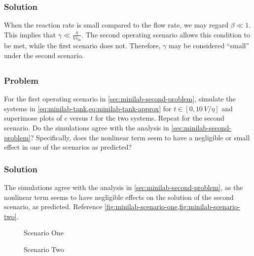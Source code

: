 \documentclass[12pt]{article}
\begin{document}
\subsubsection*{Solution}
When the reaction rate is small compared to the flow rate, we may regard $\beta
\ll 1$. This implies that $\gamma \ll \frac{\eta}{Vc_\text{in}}$. The second
operating scenario allows this condition to be met, while the first scenario
does not. Therefore, $\gamma$ may be considered ``small'' under the second
scenario.

\subsection{}
\subsubsection*{Problem}
For the first operating scenario in \cref{sec:minilab-second-problem}, simulate
the systems in \cref{eq:minilab-tank,eq:minilab-tank-approx} for
$t\in[0,10\,V/\eta]$ and superimose plots of $c$ versus $t$ for the two systems.
Repeat for the second scenario. Do the simulations agree with the analysis in
\cref{sec:minilab-second-problem}? Specifically, does the nonlinear term seem
to have a negligible or small effect in one of the scenarios as predicted?

\subsubsection*{Solution}
The simulations agree with the analysis in \cref{sec:minilab-second-problem}, as
the nonlinear term seems to have negligible effects on the solution of the
second scenario, as predicted. Reference
\cref{fig:minilab-scenario-one,fig:minilab-scenario-two}.

  \begin{figure}
    \centering
    \caption{Scenario One}
    \scalebox{0.85}{\huge}
    \label{fig:minilab-scenario-one}
  \end{figure}

  \begin{figure}
    \centering
    \caption{Scenario Two}
    \scalebox{0.85}{\huge}
    \label{fig:minilab-scenario-two}
  \end{figure}
\end{document}
